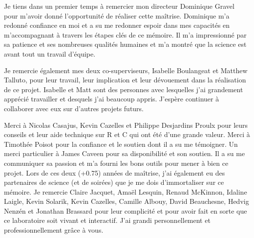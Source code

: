 

\Pagetitre
\cleardoublepage






\remerciements


Je tiens dans un premier temps à remercier mon directeur Dominique Gravel pour m'avoir donné
l'opportunité de réaliser cette maîtrise. Dominique m'a redonné confiance en moi et a su me redonner
espoir dans mes capacités en m'accompagnant à travers les étapes clés de ce mémoire. Il m'a impressionné par sa patience et ses nombreuses qualités humaines et m'a montré
que la science est avant tout un travail d'équipe.

Je remercie également mes deux co-superviseurs, Isabelle Boulangeat et Matthew Talluto, pour leur
travail, leur implication et leur dévouement dans la réalisation de ce projet. Isabelle et Matt sont
des personnes avec lesquelles j'ai grandement apprécié travailler et desquels j'ai beaucoup appris. J'espère continuer à collaborer avec eux sur d'autres projets futurs.

Merci à Nicolas Casajus, Kevin Cazelles et Philippe Desjardins Proulx pour leurs conseils et leur aide technique sur R et C qui ont été d'une grande valeur. Merci à Timothée Poisot pour la confiance et
le soutien dont il a su me témoigner. Un merci particulier à James Caveen pour sa
disponibilité et son soutien. Il a su me communiquer sa passion et m'a fourni les bons outils pour
mener à bien ce projet. Lors de ces deux (+0.75) années de maîtrise, j'ai également eu des partenaires de science (et de
soirées) que je me dois d'immortaliser sur ce mémoire. Je remercie Claire Jacquet, Amaël Lesquin,
Renaud McKinnon, Idaline Laigle, Kevin Solarik, Kevin Cazelles, Camille Albouy, David Beauchesne,
Hedvig Nenzén et Jonathan Brassard pour leur complicité et pour avoir fait en sorte que ce
laboratoire soit vivant et interactif. J'ai grandi personnellement et professionnellement
grâce à vous.

